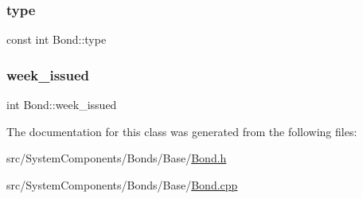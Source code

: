 \mbox{\label{classBond_a48da24878beedd71cbaa990cea860667_a48da24878beedd71cbaa990cea860667}} 
\subsubsection{\texorpdfstring{type}{type}}
{\footnotesize\ttfamily const int Bond\+::type}

\mbox{\label{classBond_a30d48d158cbbd9c7b4bfa0012c89590a_a30d48d158cbbd9c7b4bfa0012c89590a}} 
\subsubsection{\texorpdfstring{week\+\_\+issued}{week\_issued}}
{\footnotesize\ttfamily int Bond\+::week\+\_\+issued\hspace{0.3cm}{\ttfamily [protected]}}



The documentation for this class was generated from the following files\+:\begin{DoxyCompactItemize}
\item 
src/\+System\+Components/\+Bonds/\+Base/\mbox{\hyperlink{Bond_8h}{Bond.\+h}}\item 
src/\+System\+Components/\+Bonds/\+Base/\mbox{\hyperlink{Bond_8cpp}{Bond.\+cpp}}\end{DoxyCompactItemize}
